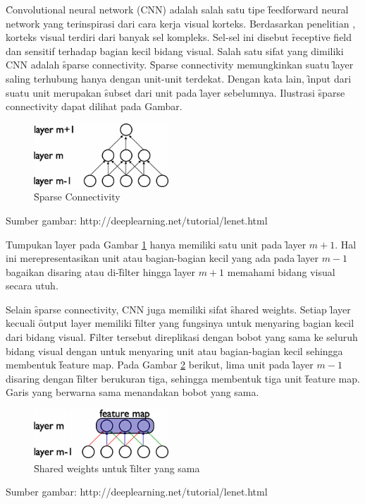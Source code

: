 \f{Convolutional neural network} (CNN) adalah salah satu tipe \f{feedforward neural network} yang terinspirasi dari cara kerja visual korteks. Berdasarkan penelitian \cite{hubel_weasel}, korteks visual terdiri dari banyak sel kompleks. Sel-sel ini disebut \f{receptive field} dan sensitif terhadap bagian kecil bidang visual. Salah satu sifat yang dimiliki CNN adalah \f{sparse connectivity}. \f{Sparse connectivity} memungkinkan suatu \f{layer} saling terhubung hanya dengan unit-unit terdekat. Dengan kata lain, \f{input} dari suatu unit merupakan \f{subset} dari unit pada \f{layer} sebelumnya. Ilustrasi \f{sparse connectivity} dapat dilihat pada Gambar.

\begin{figure}
	\centering
	\includegraphics[width=0.45\textwidth,height=0.2\textwidth]
	{pics/sparse.png}
	\caption{\f{Sparse Connectivity}}
	\label{fig:sparse}
\end{figure}
\vspace{-1.2cm}
\begin{center}
	{\small Sumber gambar: http://deeplearning.net/tutorial/lenet.html}
\end{center}

Tumpukan \f{layer} pada Gambar \ref{fig:sparse} hanya memiliki satu unit pada \f{layer} $m + 1$. Hal ini merepresentasikan unit atau bagian-bagian kecil yang ada pada \f{layer} $m - 1$ bagaikan disaring atau di-\f{filter} hingga \f{layer} $m + 1$ memahami bidang visual secara utuh. 

Selain \f{sparse connectivity}, CNN juga memiliki sifat \f{shared weights}. Setiap \f{layer} kecuali \f{output layer} memiliki \f{filter} yang fungsinya untuk menyaring bagian kecil dari bidang visual. \f{Filter} tersebut direplikasi dengan bobot yang sama ke seluruh bidang visual dengan untuk menyaring unit atau bagian-bagian kecil sehingga membentuk \f{feature map}. Pada Gambar \ref{fig:shared} berikut, lima unit pada \f{layer} $m - 1$ disaring dengan \f{filter} berukuran tiga, sehingga membentuk tiga unit \f{feature map}. Garis yang berwarna sama menandakan bobot yang sama.

\begin{figure}
	\centering
	\includegraphics[width=0.45\textwidth,height=0.15\textwidth]
	{pics/shared.png}
	\caption{\f{Shared weights} untuk \f{filter} yang sama}
	\label{fig:shared}
\end{figure}
\vspace{-1.2cm}
\begin{center}
	{\small Sumber gambar: http://deeplearning.net/tutorial/lenet.html}
\end{center}

